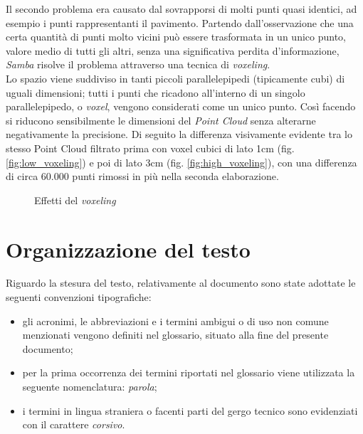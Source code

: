 \noindent
Il secondo problema era causato dal sovrapporsi di molti punti quasi identici, ad esempio i punti rappresentanti il pavimento. Partendo dall'osservazione che una certa quantità di punti molto vicini può essere trasformata in un unico punto, valore medio di tutti gli altri, senza una significativa perdita d'informazione, \emph{Samba} risolve il problema attraverso una tecnica di \emph{voxeling}.\\
Lo spazio viene suddiviso in tanti piccoli parallelepipedi (tipicamente cubi) di uguali dimensioni; tutti i punti che ricadono all'interno di un singolo parallelepipedo, o \emph{voxel}, vengono considerati come un unico punto. Così facendo si riducono sensibilmente le dimensioni del \emph{Point Cloud} senza alterarne negativamente la precisione.
Di seguito la differenza visivamente evidente tra lo stesso Point Cloud filtrato prima con voxel cubici di lato 1cm (fig. \ref{fig:low_voxeling}) e poi di lato 3cm (fig. \ref{fig:high_voxeling}), con una differenza di circa 60.000 punti rimossi in più nella seconda elaborazione.
\begin{figure}[htp] 
    \centering
    \hfill%
    \caption{Effetti del \emph{voxeling}}
\end{figure}
\newline

\section{Organizzazione del testo}
Riguardo la stesura del testo, relativamente al documento sono state adottate le seguenti convenzioni tipografiche:
\begin{itemize}
	\item gli acronimi, le abbreviazioni e i termini ambigui o di uso non comune menzionati vengono definiti nel glossario, situato alla fine del presente documento;
	\item per la prima occorrenza dei termini riportati nel glossario viene utilizzata la seguente nomenclatura: \emph{parola}\glsfirstoccur;
	\item i termini in lingua straniera o facenti parti del gergo tecnico sono evidenziati con il carattere \emph{corsivo}.
\end{itemize}